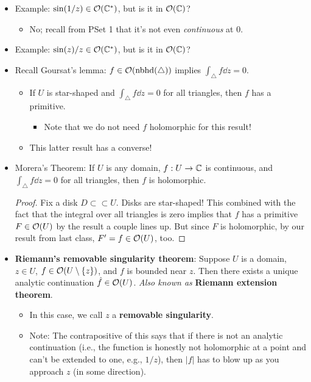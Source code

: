 \documentclass[../notes.tex]{subfiles}
\begin{document}
\begin{itemize}
\begin{itemize}
    \end{itemize}
    \item Example: $\sin(1/z)\in\mathcal{O}(\mathbb{C}^*)$, but is it in $\mathcal{O}(\mathbb{C})$?
    \begin{itemize}
        \item No; recall from PSet 1 that it's not even \emph{continuous} at 0.
    \end{itemize}
    \item Example: $\sin(z)/z\in\mathcal{O}(\mathbb{C}^*)$, but is it in $\mathcal{O}(\mathbb{C})$?
    \item Recall Goursat's lemma: $f\in\mathcal{O}(\text{nbhd}(\triangle))$ implies $\int_\triangle f\dd{z}=0$.
    \begin{itemize}
        \item If $U$ is star-shaped and $\int_\triangle f\dd{z}=0$ for all triangles, then $f$ has a primitive.
        \begin{itemize}
            \item Note that we do not need $f$ holomorphic for this result!
        \end{itemize}
        \item This latter result has a converse!
    \end{itemize}
    \item Morera's Theorem: If $U$ is any domain, $f:U\to\mathbb{C}$ is continuous, and $\int_\triangle f\dd{z}=0$ for all triangles, then $f$ is holomorphic.
    \begin{proof}
        Fix a disk $D\subset\subset U$. Disks are star-shaped! This combined with the fact that the integral over all triangles is zero implies that $f$ has a primitive $F\in\mathcal{O}(U)$ by the result a couple lines up. But since $F$ is holomorphic, by our result from last class, $F'=f\in\mathcal{O}(U)$, too.
    \end{proof}
    \item \textbf{Riemann's removable singularity theorem}: Suppose $U$ is a domain, $z\in U$, $f\in\mathcal{O}(U\setminus\{z\})$, and $f$ is bounded near $z$. Then there exists a unique analytic continuation $\hat{f}\in\mathcal{O}(U)$. \emph{Also known as} \textbf{Riemann extension theorem}.
    \begin{itemize}
        \item In this case, we call $z$ a \textbf{removable singularity}.
        \item Note: The contrapositive of this says that if there is not an analytic continuation (i.e., the function is honestly not holomorphic at a point and can't be extended to one, e.g., $1/z$), then $|f|$ has to blow up as you approach $z$ (in some direction).

\end{itemize}
\end{itemize}
\end{document}
